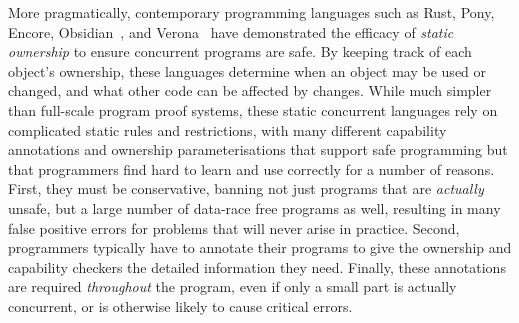 More pragmatically,
contemporary programming languages such as
Rust\cite{RustBook}, Pony\cite{PonyTS},
Encore\cite{EncoreTS},
Obsidian~\cite{aldrichObsidianStudy2020}, and
Verona~\cite{VeronaConcur2023}
have demonstrated the efficacy of \textit{static
  ownership}\cite{ClaPotNobOOPSLA98,NobPotVitECOOP98} %
to ensure
concurrent programs are safe.
By keeping track of each object's
ownership, these languages determine when an object may be used
or changed, and what other code can be affected by changes.
%
%
%
%
While much simpler than full-scale program proof systems, these static
concurrent 
languages rely on complicated static rules and
restrictions, with many different capability annotations and ownership
parameterisations that support safe programming but that programmers find hard to learn and use
correctly \cite{LearnRust,VizRust,HardRust} %
for a number of
reasons. First, they must be conservative, banning not just
programs that are \textit{actually} unsafe, but a large
number of data-race free programs as well, resulting in
many false positive errors for
problems that will never arise in practice.
Second,
programmers typically have to annotate their programs to give the
ownership and capability checkers the detailed information they need.
Finally, these annotations are required \textit{throughout}
the program,  even if only a small part is actually concurrent, or is
otherwise likely to cause critical errors.


